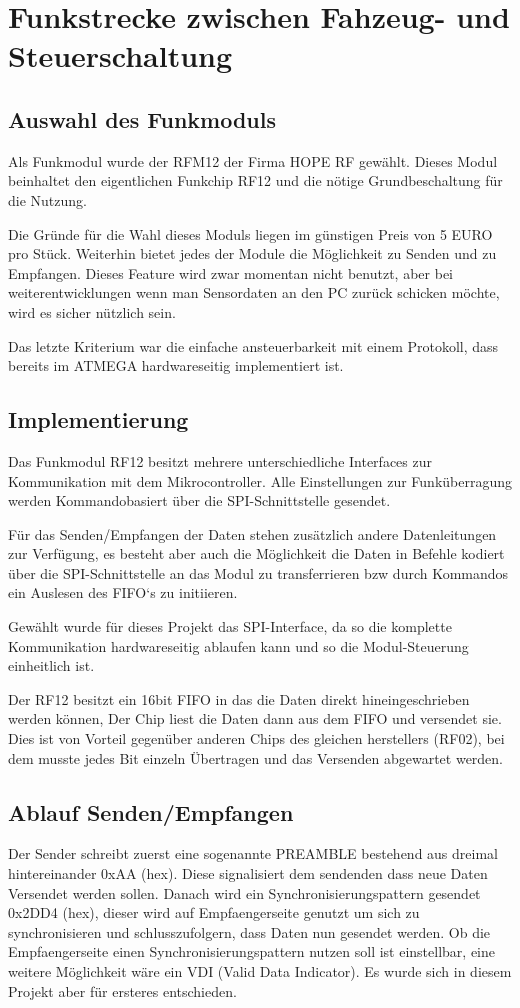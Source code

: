 \documentclass{scrartcl}
\begin{document}
\section{Funkstrecke zwischen Fahzeug- und Steuerschaltung}
	\subsection{Auswahl des Funkmoduls}
		Als Funkmodul wurde der RFM12 der Firma HOPE RF gewählt.
		Dieses Modul beinhaltet den eigentlichen Funkchip RF12 und die nötige Grundbeschaltung für die Nutzung.


		Die Gründe für die Wahl dieses Moduls liegen im günstigen Preis von 5 EURO pro Stück.
		Weiterhin bietet jedes der Module die Möglichkeit zu Senden und zu Empfangen.
		Dieses Feature wird zwar momentan nicht benutzt, aber bei weiterentwicklungen wenn man Sensordaten
		an den PC zurück schicken möchte, wird es sicher nützlich sein.
		
		Das letzte Kriterium war die einfache ansteuerbarkeit mit einem Protokoll, dass bereits im ATMEGA 
		hardwareseitig implementiert ist.
	\subsection{Implementierung}
		Das Funkmodul RF12 besitzt mehrere unterschiedliche Interfaces 
		zur Kommunikation mit dem Mikrocontroller.
		Alle Einstellungen zur Funküberragung werden Kommandobasiert
		über die SPI-Schnittstelle gesendet.

		Für das Senden/Empfangen der Daten stehen zusätzlich andere Datenleitungen
		zur Verfügung, es besteht aber auch die Möglichkeit die Daten in Befehle
		kodiert über die SPI-Schnittstelle an das Modul zu transferrieren bzw
		durch Kommandos ein Auslesen des FIFO`s zu initiieren.

		Gewählt wurde für dieses Projekt das SPI-Interface, da so die komplette 
		Kommunikation hardwareseitig ablaufen kann und so die Modul-Steuerung einheitlich ist.

		Der RF12 besitzt ein 16bit FIFO in das die Daten direkt hineingeschrieben werden können,
		Der Chip liest die Daten dann aus dem FIFO und versendet sie.
		Dies ist von Vorteil gegenüber anderen Chips des gleichen herstellers (RF02), bei dem
		musste jedes Bit einzeln Übertragen und das Versenden abgewartet werden.

	\subsection{Ablauf Senden/Empfangen}
		Der Sender schreibt zuerst eine sogenannte PREAMBLE bestehend aus dreimal 
		hintereinander 0xAA (hex). Diese signalisiert dem sendenden dass neue Daten 
		Versendet werden sollen.
		Danach wird ein Synchronisierungspattern gesendet 0x2DD4 (hex), dieser wird
		auf Empfaengerseite genutzt um sich zu synchronisieren und schlusszufolgern,
		dass Daten nun gesendet werden. Ob die Empfaengerseite einen
		Synchronisierungspattern nutzen soll ist einstellbar, eine weitere Möglichkeit
		wäre ein VDI (Valid Data Indicator). Es wurde sich in diesem Projekt
		aber für ersteres entschieden.
\end{document}
